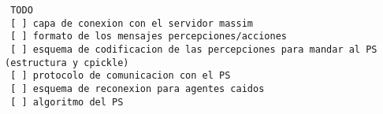 \documentclass[10pt]{report}
\newcommand{\clearemptydoublepage}{\newpage\thispagestyle{empty}\cleardoublepage}
\begin{document}
 \begin{verbatim}
 TODO
 [ ] capa de conexion con el servidor massim
 [ ] formato de los mensajes percepciones/acciones
 [ ] esquema de codificacion de las percepciones para mandar al PS (estructura y cpickle)
 [ ] protocolo de comunicacion con el PS
 [ ] esquema de reconexion para agentes caidos
 [ ] algoritmo del PS
 \end{verbatim}


\pagestyle{empty}

   
\clearemptydoublepage

 
\clearemptydoublepage

% 

\setcounter{page}{1}

\tableofcontents 
\clearemptydoublepage

\pagestyle{fancyplain}
\setcounter{page}{1}

 
\clearemptydoublepage

 
\clearemptydoublepage

 
\clearemptydoublepage

 
\clearemptydoublepage

 
\clearemptydoublepage

\end{document}
